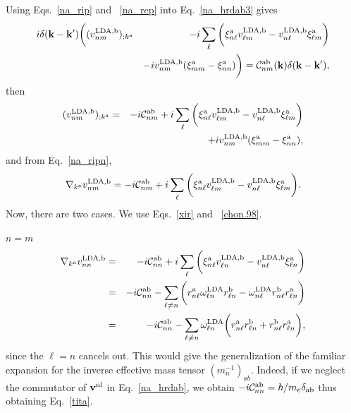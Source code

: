 \documentclass[floatfix,prb,aps,superscriptaddress,11pt,preprint]{revtex4}
\begin{document}
Using Eqs.~\eqref{na_rip} and ~\eqref{na_rep}
into Eq.~\eqref{na_hrdab3} gives
\begin{eqnarray}\label{na_rapb}
i\delta(\mathbf{k}-\mathbf{k}')
\bigg(
(v^{\mathrm{LDA},\mathrm{b}}_{nm})_{;k^{\mathrm{a}}}
&&
-i
\sum_{\ell}
\bigg(
\xi^{\mathrm{a}}_{n\ell}
v^{\mathrm{LDA},\mathrm{b}}_{\ell m}
-
v^{\mathrm{LDA},\mathrm{b}}_{n\ell}
\xi^{\mathrm{a}}_{\ell m}
\bigg)
\nonumber \\
&&
-i
v^{\mathrm{LDA},\mathrm{b}}_{nm}(\xi^{\mathrm{a}}_{mm}
-
\xi^{\mathrm{a}}_{nn}
)
\bigg)
=
{\mathbf{\cal C}}^{\mathrm{a}\mathrm{b}}_{nm}(\mathbf{k})\delta(\mathbf{k}-\mathbf{k}')
,
\end{eqnarray}
then
\begin{eqnarray}\label{na_rapb2}
(v^{\mathrm{LDA},\mathrm{b}}_{nm})_{;k^{\mathrm{a}}}&=&
-i
{\mathbf{\cal C}}^{\mathrm{a}\mathrm{b}}_{nm}
+i
\sum_{\ell}
\bigg(
\xi^{\mathrm{a}}_{n\ell}
v^{\mathrm{LDA},\mathrm{b}}_{\ell m}
-
v^{\mathrm{LDA},\mathrm{b}}_{n\ell}
\xi^{\mathrm{a}}_{\ell m}
\bigg)
\nonumber \\
&&+i
v^{\mathrm{LDA},\mathrm{b}}_{nm}(\xi^{\mathrm{a}}_{mm}
-
\xi^{\mathrm{a}}_{nn}
)
,
\end{eqnarray}
and from Eq.~\eqref{na_ripn},
\begin{eqnarray}\label{ncogno}
\nabla_{k^{\mathrm{a}}}v^{\mathrm{LDA},\mathrm{b}}_{nm}=
-i{\mathbf{\cal C}}^{\mathrm{a}\mathrm{b}}_{nm}
+i
\sum_{\ell}
\bigg(
\xi^{\mathrm{a}}_{n\ell}
v^{\mathrm{LDA},\mathrm{b}}_{\ell m}
-
v^{\mathrm{LDA},\mathrm{b}}_{n\ell}
\xi^{\mathrm{a}}_{\ell m}
\bigg)
.
\end{eqnarray}
Now, there are two cases. We use Eqs.~\eqref{xir} and ~\eqref{chon.98}.

 $n=m$
\begin{eqnarray}\label{ntita}
\nabla_{k^{\mathrm{a}}}v^{\mathrm{LDA},\mathrm{b}}_{nn}&=&
-i{\mathbf{\cal C}}^{\mathrm{a}\mathrm{b}}_{nn}
+i
\sum_{\ell}
\bigg(
\xi^{\mathrm{a}}_{n\ell}
v^{\mathrm{LDA},\mathrm{b}}_{\ell n}
-
v^{\mathrm{LDA},\mathrm{b}}_{n\ell}
\xi^{\mathrm{a}}_{\ell n}
\bigg)
\nonumber\\
&=&
-i{\mathbf{\cal C}}^{\mathrm{a}\mathrm{b}}_{nn}
-
\sum_{\ell\ne n}
\bigg(
r^{\mathrm{a}}_{n\ell}
\omega^{\mathrm{LDA}}_{\ell n}
r^{\mathrm{b}}_{\ell n}
-
\omega^{\mathrm{LDA}}_{n\ell}
r^{\mathrm{b}}_{n\ell}
r^{\mathrm{a}}_{\ell n}
\bigg)
\nonumber\\
&=&
-i{\mathbf{\cal C}}^{\mathrm{a}\mathrm{b}}_{nn}
-
\sum_{\ell\ne n}
\omega^{\mathrm{LDA}}_{\ell n}
\bigg(
r^{\mathrm{a}}_{n\ell}
r^{\mathrm{b}}_{\ell n}
+
r^{\mathrm{b}}_{n\ell}
r^{\mathrm{a}}_{\ell n}
\bigg)
,
\end{eqnarray}
since the $\ell=n$ cancels out. This
would give the generalization of the familiar expansion for the inverse effective mass
tensor $(m_n^{-1})_{ab}$.\cite{aschcroft}
Indeed, if we neglect the commutator of $\mathbf{v}^{\mathrm{nl}}$ in
Eq.~\eqref{na_hrdab}, we obtain 
$-i{\mathbf{\cal C}}^{\mathrm{a}\mathrm{b}}_{nn}=\hbar/m_e\delta_{\mathrm{a}\mathrm{b}}$
thus obtaining Eq.~\eqref{tita}.
\end{document}
